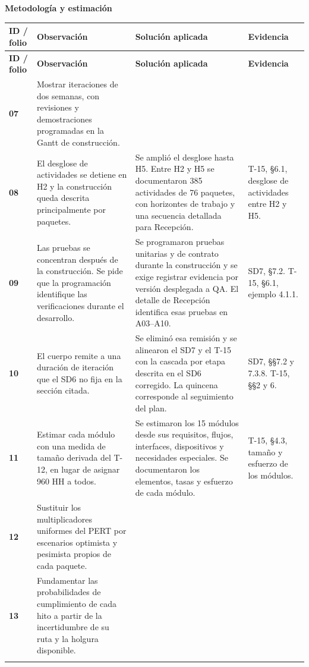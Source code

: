 \documentclass[11pt,letterpaper]{article}
\makeatletter
\newcommand{\tema}[1]{\par{\Large\bfseries #1}\par}
\newcommand{\cabecera}{\rowcolor{fondo}
  \textbf{ID / folio} & \textbf{Observación} & \textbf{Solución aplicada} & \textbf{Evidencia}\\}
\newenvironment{matriz}{%
  \fontsize{10}{13}\selectfont
  \begin{longtable}{@{}>{\RaggedRight\arraybackslash}p{.099\linewidth}
                      >{\RaggedRight\arraybackslash}p{.360\linewidth}
                      >{\RaggedRight\arraybackslash}p{.329\linewidth}
                      >{\RaggedRight\arraybackslash}p{.152\linewidth}@{}}
    \cabecera\endfirsthead
    \cabecera\endhead
}{\end{longtable}\normalsize}
\newcommand{\observacion}[5]{%
  \rule{0pt}{2.3ex}\textbf{#1}\newline {\footnotesize #2} &
  #3 & #4 & #5 \\[2pt]\arrayrulecolor{regla}\midrule}
\makeatother
\begin{document}
\newpage
\tema{Metodología y estimación}
\begin{matriz}
\observacion{07}{25, 27, 29--30, 33, 54}
{Mostrar iteraciones de dos semanas, con revisiones y demostraciones programadas en la Gantt de construcción.}{}{}
\observacion{08}{27, 29--30}
{El desglose de actividades se detiene en H2 y la construcción queda descrita principalmente por paquetes.}
{Se amplió el desglose hasta H5. Entre H2 y H5 se documentaron 385 actividades de 76 paquetes, con horizontes de trabajo y una secuencia detallada para Recepción.}
{T-15, §6.1, desglose de actividades entre H2 y H5.}
\observacion{09}{25, 29--30, 41, 54}
{Las pruebas se concentran después de la construcción. Se pide que la programación identifique las verificaciones durante el desarrollo.}
{Se programaron pruebas unitarias y de contrato durante la construcción y se exige registrar evidencia por versión desplegada a QA. El detalle de Recepción identifica esas pruebas en A03--A10.}
{SD7, §7.2. T-15, §6.1, ejemplo 4.1.1.}
\observacion{10}{30}
{El cuerpo remite a una duración de iteración que el SD6 no fija en la sección citada.}
{Se eliminó esa remisión y se alinearon el SD7 y el T-15 con la cascada por etapa descrita en el SD6 corregido. La quincena corresponde al seguimiento del plan.}
{SD7, §§7.2 y 7.3.8. T-15, §§2 y 6.}
\observacion{11}{28, 33, 53}
{Estimar cada módulo con una medida de tamaño derivada del T-12, en lugar de asignar 960 HH a todos.}
{Se estimaron los 15 módulos desde sus requisitos, flujos, interfaces, dispositivos y necesidades especiales. Se documentaron los elementos, tasas y esfuerzo de cada módulo.}
{T-15, §4.3, tamaño y esfuerzo de los módulos.}
\observacion{12}{29, 33, 53}
{Sustituir los multiplicadores uniformes del PERT por escenarios optimista y pesimista propios de cada paquete.}{}{}
\observacion{13}{29, 53}
{Fundamentar las probabilidades de cumplimiento de cada hito a partir de la incertidumbre de su ruta y la holgura disponible.}{}{}
\end{matriz}
\end{document}
